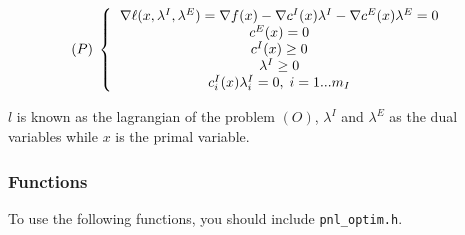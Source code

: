 \begin{equation*}
  (P)\;
  \left\{
    \begin{tabular}{c}
      $\nabla \ell(x,\lambda^I, \lambda^E) = \nabla f(x) - \nabla c^I(x) \lambda^I - \nabla c^E(x) \lambda^E= 0$ \\
      $c^E(x) = 0 $ \\
      $c^I(x) \geq 0 $ \\
      $\lambda^I \geq 0 $\\
      $c^I_i(x) \lambda^I_i =0, \; i=1...m_I$ \\
    \end{tabular}
  \right.
\end{equation*}

$l$ is known as the lagrangian of the problem $(O)$, $\lambda^I$ and $\lambda^E$ as the dual variables while $x$ is the primal variable.

\subsubsection{Functions}

To use the following functions, you should include \verb!pnl_optim.h!.

